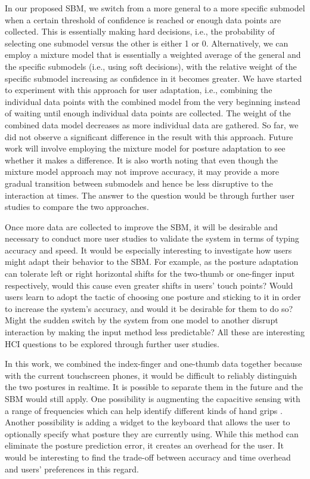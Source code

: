 \documentclass{sigchi}
\begin{document}
In our proposed SBM, we switch from a more general to a more specific submodel
when a certain threshold of confidence is reached or enough data points are
collected. This is essentially making hard decisions, i.e., the probability of
selecting one submodel versus the other is either 1 or 0. Alternatively,
we can employ a mixture model that is essentially a weighted average of
the general and the specific submodels (i.e., using soft decisions), with the
relative weight of the specific submodel increasing as confidence in it becomes
greater. We have started to experiment with this approach for user adaptation,
i.e., combining the individual data points with the combined model from the very beginning instead
of waiting until enough individual data points are collected. The weight of the
combined data model decreases as more individual data are gathered. So far, we
did not observe a significant difference in the result with this approach.
Future work will involve employing the mixture model for posture adaptation to see whether it makes a difference.
It is also worth noting that even though the mixture model approach may not
improve accuracy, it may provide a more gradual transition between submodels
and hence be less disruptive to the interaction at times. The answer to the
question would be through further user studies to compare the two approaches. 

Once more data are collected to improve the SBM, it will be desirable and
necessary to conduct more user studies to validate the system in terms of typing
accuracy and speed. It would be especially interesting to investigate how users
might adapt their behavior to the SBM. For example, as the posture adaptation
can tolerate left or right horizontal shifts for the two-thumb or one-finger
input respectively, would this cause even
greater shifts in users' touch points? Would users learn to adopt the
tactic of choosing one posture and sticking to it in order to increase the system's
accuracy, and would it be desirable for them to do so? Might the sudden switch
by the system from one model to another disrupt interaction by making the input 
method less predictable? All these are interesting HCI questions to be explored
through further user studies.

In this work, we combined the index-finger and one-thumb data together because 
with the current touchscreen phones, it would be difficult to reliably 
distinguish the two postures in realtime. It is possible to separate them in the
future and the SBM would still apply. One possibility is augmenting the
capacitive sensing with a range of frequencies which can help identify different kinds of 
hand grips \cite{Sato:2012}. Another possibility is adding a widget to the
keyboard that allows the user to optionally specify what posture they are
currently using. While this method can eliminate the posture
prediction error, it creates an overhead for the user. It would be interesting
to find the trade-off between accuracy and time overhead
and users' preferences in this regard.
\end{document}
